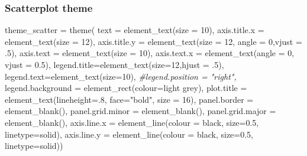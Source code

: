 \documentclass[
]{article}
\newenvironment{Shaded}{\begin{snugshade}}{\end{snugshade}}
\newcommand{\AttributeTok}[1]{\textcolor[rgb]{0.77,0.63,0.00}{#1}}
\newcommand{\CommentTok}[1]{\textcolor[rgb]{0.56,0.35,0.01}{\textit{#1}}}
\newcommand{\DecValTok}[1]{\textcolor[rgb]{0.00,0.00,0.81}{#1}}
\newcommand{\FloatTok}[1]{\textcolor[rgb]{0.00,0.00,0.81}{#1}}
\newcommand{\FunctionTok}[1]{\textcolor[rgb]{0.00,0.00,0.00}{#1}}
\newcommand{\NormalTok}[1]{#1}
\newcommand{\OtherTok}[1]{\textcolor[rgb]{0.56,0.35,0.01}{#1}}
\newcommand{\StringTok}[1]{\textcolor[rgb]{0.31,0.60,0.02}{#1}}
\begin{document}
\hypertarget{scatterplot-theme}{%
\subsubsection{Scatterplot theme}\label{scatterplot-theme}}

\begin{Shaded}
\begin{Highlighting}[]
\NormalTok{theme\_scatter }\OtherTok{=} \FunctionTok{theme}\NormalTok{(}
\AttributeTok{text =} \FunctionTok{element\_text}\NormalTok{(}\AttributeTok{size =} \DecValTok{10}\NormalTok{),}
\AttributeTok{axis.title.x =} \FunctionTok{element\_text}\NormalTok{(}\AttributeTok{size =} \DecValTok{12}\NormalTok{),}
\AttributeTok{axis.title.y =} \FunctionTok{element\_text}\NormalTok{(}\AttributeTok{size =} \DecValTok{12}\NormalTok{, }\AttributeTok{angle =} \DecValTok{0}\NormalTok{,}\AttributeTok{vjust =}\NormalTok{ .}\DecValTok{5}\NormalTok{),}
\AttributeTok{axis.text =} \FunctionTok{element\_text}\NormalTok{(}\AttributeTok{size =} \DecValTok{10}\NormalTok{),}
\AttributeTok{axis.text.x =} \FunctionTok{element\_text}\NormalTok{(}\AttributeTok{angle =} \DecValTok{0}\NormalTok{, }\AttributeTok{vjust =} \FloatTok{0.5}\NormalTok{),}
\AttributeTok{legend.title=}\FunctionTok{element\_text}\NormalTok{(}\AttributeTok{size=}\DecValTok{12}\NormalTok{,}\AttributeTok{hjust =}\NormalTok{ .}\DecValTok{5}\NormalTok{),}
\AttributeTok{legend.text=}\FunctionTok{element\_text}\NormalTok{(}\AttributeTok{size=}\DecValTok{10}\NormalTok{),}
\CommentTok{\#legend.position = "right",}
\AttributeTok{legend.background =} \FunctionTok{element\_rect}\NormalTok{(}\AttributeTok{colour=}\StringTok{\textquotesingle{}light grey\textquotesingle{}}\NormalTok{),}
\AttributeTok{plot.title =} \FunctionTok{element\_text}\NormalTok{(}\AttributeTok{lineheight=}\NormalTok{.}\DecValTok{8}\NormalTok{, }\AttributeTok{face=}\StringTok{"bold"}\NormalTok{, }\AttributeTok{size =} \DecValTok{16}\NormalTok{),}
\AttributeTok{panel.border =} \FunctionTok{element\_blank}\NormalTok{(),}
\AttributeTok{panel.grid.minor =} \FunctionTok{element\_blank}\NormalTok{(),}
\AttributeTok{panel.grid.major =} \FunctionTok{element\_blank}\NormalTok{(),}
\AttributeTok{axis.line.x =} \FunctionTok{element\_line}\NormalTok{(}\AttributeTok{colour =} \StringTok{\textquotesingle{}black\textquotesingle{}}\NormalTok{, }\AttributeTok{size=}\FloatTok{0.5}\NormalTok{, }\AttributeTok{linetype=}\StringTok{\textquotesingle{}solid\textquotesingle{}}\NormalTok{),}
\AttributeTok{axis.line.y =} \FunctionTok{element\_line}\NormalTok{(}\AttributeTok{colour =} \StringTok{\textquotesingle{}black\textquotesingle{}}\NormalTok{, }\AttributeTok{size=}\FloatTok{0.5}\NormalTok{, }\AttributeTok{linetype=}\StringTok{\textquotesingle{}solid\textquotesingle{}}\NormalTok{))}
\end{Highlighting}
\end{Shaded}
\end{document}
